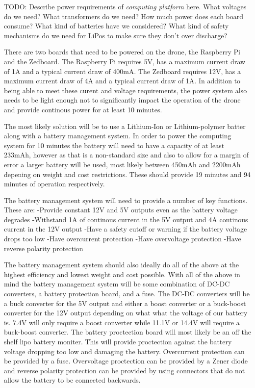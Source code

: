 TODO: Describe power requirements of \textit{computing platform} here. What voltages do we need? What transformers do we need? How much power does each board consume? What kind of batteries have we considered? What kind of safety mechanisms do we need for LiPos to make sure they don't over discharge?

There are two boards that need to be powered on the drone, the Raspberry Pi and the Zedboard. The Raspberry Pi requires
5V, has a maximum current draw of 1A and a typical current draw of 400mA. The Zedboard requires 12V, has a maximum current draw of
4A and a typical current draw of 1A. In addition to being able to meet these curent and voltage requirements, the power system also
needs to be light enough not to significantly impact the operation of the drone and provide continous power for at least 10 minutes.

The most likely solution will be to use a Lithium-Ion or Lithium-polymer batter along with a battery management system. In order to
power the computing system for 10 minutes the battery will need to have a capacity of at least 233mAh, however as that is a non-standard size and also to allow for a margin of error a larger battery will be used, most likely between 450mAh and 2200mAh depening on weight and cost restrictions. These should provide 19 minutes and 94 minutes of operation respectively.

The battery management system will need to provide a number of key functions. These are:
  -Provide constant 12V and 5V outputs even as the battery voltage degrades
  -Withstand 1A of continous current in the 5V output and 4A continous current in the 12V output
  -Have a safety cutoff or warning if the battery voltage drops too low
  -Have overcurrent protection
  -Have overvoltage protection
  -Have reverse polarity protection
 
 The battery management system should also ideally do all of the above at the highest efficiency and lowest weight and cost possible. With all of the above in mind the battery management system will be some combination of DC-DC converters, a battery protection board, and a fuse. The DC-DC converters will be a buck converter for the 5V output and either a boost converter or a buck-boost converter for the 12V output depending on what what the voltage of our battery is. 7.4V will only require a boost converter while 11.1V or 14.4V will require a buck-boost converter. The battery proctection board will most likely be an off the shelf lipo battery moniter. This will provide proctection against the battery voltage dropping too low and damaging the battery. Overcurrent protection can be provided by a fuse. Overvoltage proctection can be provided by a Zener diode and reverse polarity protection can be provided by using connectors that do not allow the battery to be connected backwards.
